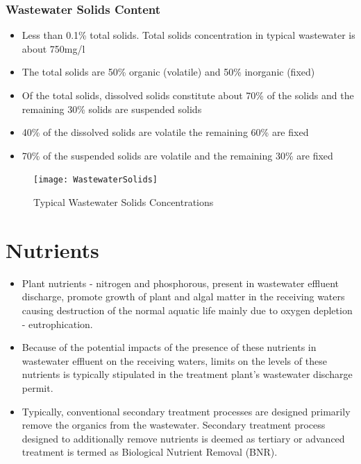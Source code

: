 	\subsubsection{Wastewater Solids Content}			
			\begin{itemize}
				\item Less than 0.1\% total solids.  Total solids concentration in typical wastewater is about 750mg/l
				\item The total solids are 50\% organic (volatile) and 50\% inorganic (fixed)
				\item Of the total solids, dissolved solids constitute about 70\% of the solids and the remaining 30\% solids are suspended solids
				\item 40\% of the dissolved solids are volatile the remaining 60\% are fixed
				\item 70\% of the suspended solids are volatile and the remaining 30\% are fixed
			\end{itemize}
			\begin{figure}[!htbp]
			\vspace{2cm}
				\begin{center}
					\texttt{[image: WastewaterSolids]}\\
					\caption{Typical Wastewater Solids Concentrations}
				\end{center}
				\end{figure}
				
\section{Nutrients}	
			\begin{itemize}
				\item Plant nutrients - nitrogen and phosphorous, present in wastewater effluent discharge, promote growth of plant and algal matter in the receiving waters causing destruction of the normal aquatic life mainly due to oxygen depletion - eutrophication.
				      
				\item Because of the potential impacts of the presence of these nutrients in wastewater effluent on the receiving waters,  limits on the levels of these nutrients is typically stipulated in the treatment plant's wastewater discharge permit.
				      
				\item Typically, conventional secondary treatment processes are designed primarily remove the organics from the wastewater.  Secondary treatment process designed to additionally remove nutrients is deemed as tertiary or advanced treatment is termed as Biological Nutrient Removal (BNR).
			\end{itemize}
